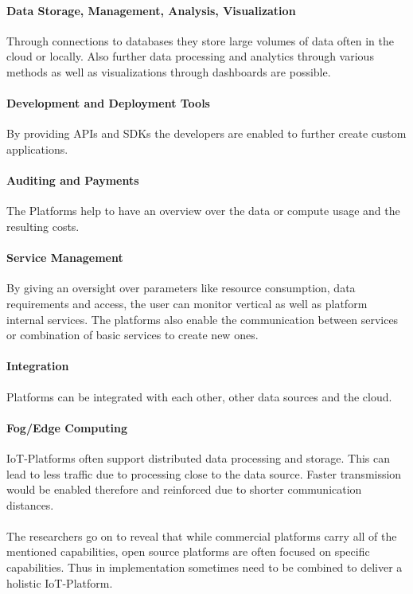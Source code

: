 \paragraph{Data Storage, Management, Analysis, Visualization}
Through connections to databases they store large volumes of data often in the cloud or locally. Also further data processing and analytics through various methods as well as visualizations through dashboards are possible.
\paragraph{Development and Deployment Tools}
By providing APIs and SDKs the developers are enabled to further create custom applications.
\paragraph{Auditing and Payments}
The Platforms help to have an overview over the data or compute usage and the resulting costs.
\paragraph{Service Management}
By giving an oversight over parameters like resource consumption, data requirements and access, the user can monitor vertical as well as platform internal services. The platforms also enable the communication between services or combination of basic services to create new ones.
\paragraph{Integration}
Platforms can be integrated with each other, other data sources and the cloud. 
\paragraph{Fog/Edge Computing}
IoT-Platforms often support distributed data processing and storage. This can lead to less traffic due to processing close to the data source. Faster transmission would be enabled therefore and reinforced due to  shorter communication distances.
\\\\The researchers go on to reveal that while commercial platforms carry all of the mentioned capabilities, open source platforms are often focused on specific capabilities. Thus in implementation sometimes need to be combined to deliver a holistic IoT-Platform. 
